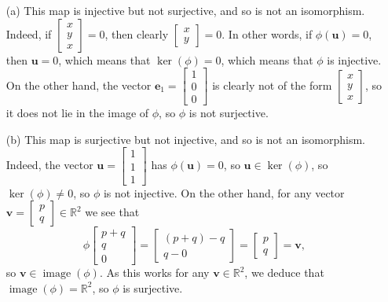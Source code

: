 \documentclass{amsart}
\newcommand{\R}         {{\mathbb{R}}}
\newcommand{\img}       {\operatorname{image}}
\newcommand{\bsm}       {\left[\begin{smallmatrix}}
\newcommand{\esm}       {\end{smallmatrix}\right]}
\newcommand{\ve}        {\mathbf{e}}
\newcommand{\vu}        {\mathbf{u}}
\newcommand{\vv}        {\mathbf{v}}
\renewcommand{\:}       {\colon}
\theoremstyle{definition}
\renewenvironment{solution}{\SolutionAtEnd}{\endSolutionAtEnd}
\begin{document}
\begin{solution}
 \begin{itemize}
  \item[(a)] This map is injective but not surjective, and
   so is not an isomorphism.  Indeed, if $\bsm x\\ y\\ x\esm=0$,
   then clearly $\bsm x\\ y\esm=0$.  In other words, if
   $\phi(\vu)=0$, then $\vu=0$, which means that
   $\ker(\phi)=0$, which means that $\phi$ is injective.  On
   the other hand, the vector $\ve_1=\bsm 1\\0\\0\esm$ is
   clearly not of the form $\bsm x\\ y\\ x\esm$, so it does
   not lie in the image of $\phi$, so $\phi$ is not
   surjective. 
  \item[(b)] This map is surjective but not injective, and
   so is not an isomorphism.   Indeed, the vector
   $\vu=\bsm 1\\ 1\\ 1 \esm$ has $\phi(\vu)=0$, so
   $\vu\in\ker(\phi)$, so $\ker(\phi)\neq 0$, so $\phi$ is
   not injective.  On the other hand, for any vector
   $\vv=\bsm p\\ q\esm\in\R^2$ we see that
   \[ \phi\bsm p+q\\q\\0\esm = 
       \bsm (p+q)-q \\ q-0 \esm = \bsm p\\ q\esm = \vv,
   \]
   so $\vv\in\img(\phi)$.  As this works for any
   $\vv\in\R^2$, we deduce that $\img(\phi)=\R^2$, so $\phi$
   is surjective. 


\end{itemize}
\end{solution}
\end{document}
